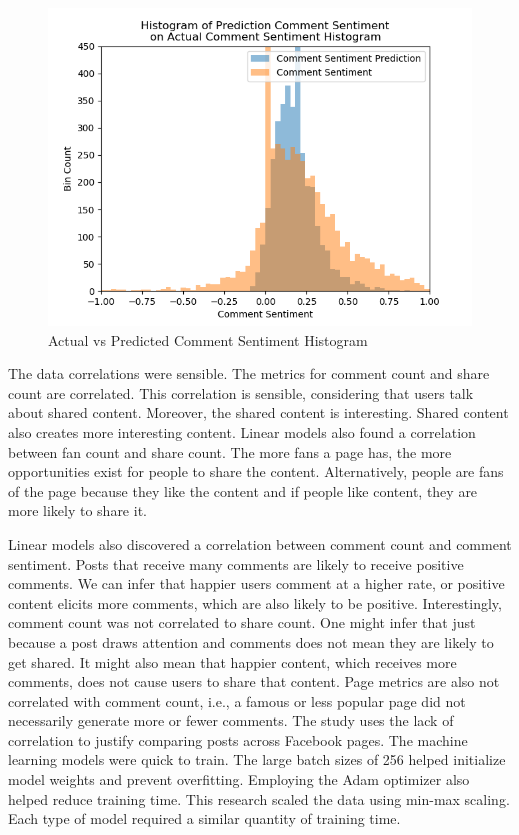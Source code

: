 \documentclass{article}
\begin{document}
\begin{figure}
\centering
\includegraphics[width=\columnwidth]{images/Sentiment_Prediction_vs_Actual.png}
\caption{Actual vs Predicted Comment Sentiment Histogram}
\label{comment_sentiment_histogram}
\end{figure}

The data correlations were sensible. The metrics for comment count and share count are correlated. This correlation is sensible, considering that users talk about shared content. Moreover, the shared content is interesting. Shared content also creates more interesting content. Linear models also found a correlation between fan count and share count. The more fans a page has, the more opportunities exist for people to share the content. Alternatively, people are fans of the page because they like the content and if people like content, they are more likely to share it. 

Linear models also discovered a correlation between comment count and comment sentiment. Posts that receive many comments are likely to receive positive comments. We can infer that happier users comment at a higher rate, or positive content elicits more comments, which are also likely to be positive. Interestingly, comment count was not correlated to share count. One might infer that just because a post draws attention and comments does not mean they are likely to get shared. It might also mean that happier content, which receives more comments, does not cause users to share that content. Page metrics are also not correlated with comment count, i.e., a famous or less popular page did not necessarily generate more or fewer comments. The study uses the lack of correlation to justify comparing posts across Facebook pages.
The machine learning models were quick to train. The large batch sizes of 256 helped initialize model weights and prevent overfitting. Employing the Adam optimizer also helped reduce training time. This research scaled the data using min-max scaling. Each type of model required a similar quantity of training time. 
\end{document}
